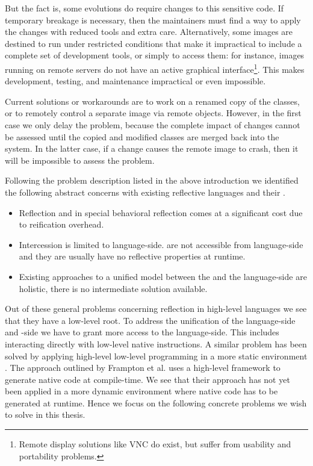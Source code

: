 But the fact is, some evolutions do require changes to this sensitive code.
If temporary breakage is necessary, then the maintainers must find a way to apply the changes with reduced tools and extra care.
Alternatively, some images are destined to run under restricted conditions that make it impractical to include a complete set of development tools, or simply to access them: for instance, images running on remote servers do not have an active graphical interface\footnote{Remote display solutions like VNC do exist, but suffer from usability and portability problems.}.
This makes development, testing, and maintenance impractical or even impossible.

Current solutions or workarounds are to work on a renamed copy of the classes, or to remotely control a separate image via remote objects.
However, in the first case we only delay the problem, because the complete impact of changes cannot be assessed until the copied and modified classes are merged back into the system.
In the latter case, if a change causes the remote image to crash, then it will be impossible to assess the problem.



Following the problem description listed in the above introduction we identified the following abstract concerns with existing reflective languages and their \VMs.
%
\begin{itemize}
	\item Reflection and in special behavioral reflection comes at a significant cost due to reification overhead.
		
	\item Intercession is limited to language-side.
	\VMs are not accessible from language-side and they are usually have no reflective properties at runtime. 
	
	\item Existing approaches to a unified model between the \VM and the language-side are holistic, there is no intermediate solution available.
\end{itemize}

\noindent Out of these general problems concerning reflection in high-level languages we see that they have a low-level root.
To address the unification of the language-side and \VM-side we have to grant more access to the language-side.
This includes interacting directly with low-level native instructions.
A similar problem has been solved by applying high-level low-level programming in a more static environment \cite{Fram09a,Graal}.
The approach outlined by Frampton et al. uses a high-level framework to generate native code at compile-time.
We see that their approach has not yet been applied in a more dynamic environment where native code has to be generated at runtime.
Hence we focus on the following concrete problems we wish to solve in this thesis.

